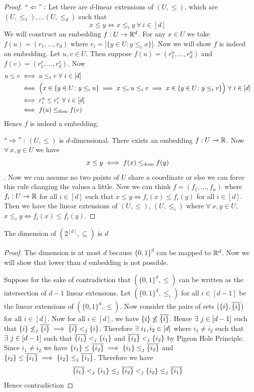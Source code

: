 \begin{proof}
	$``\Leftarrow":$ Let there are $d$-linear extensions of $(U,\leq)$, which are $(U,\leq_1),\dots(U,\leq_d)$ such that $$x\leq y\iff x\leq_i y\ \forall\ i\in[d]$$We will construct an embedding $f:U\to \mathbb{R}^d$. For any $x\in U$ we take $f(u)=(r_1,\dots, r_d)$ where $r_i=|\{y\in U\colon y\leq_i x\}|$. Now we will show $f$ is indeed an embedding. Let $u,v\in U$. Then  suppose $f(u)=(r_1^u,\dots,r_d^u)$ and $f(v)=(r_1^v,\dots, r_d^v)$. Now 
	\begin{align*}
		u\leq v&\iff u\leq_i v\ \forall \ i\in[d]\\
		 & \iff \Big(x\in\{y\in U\colon y\leq_i u\}\implies x\leq_i u\leq_i v\implies x\in   \{y\in U\colon y\leq_i v\}  \Big)\ \forall \ i\in[d]\\
		 & \iff r_i^u\leq r_i^v\ \forall \ i\in[d]\\
		 & \iff f(u)\domrel f(v)
	\end{align*}Hence $f$ is indeed a embedding. 

$``\Rightarrow":$ $(U,\leq)$ is $d$-dimensional. There exists an embedding $f:U\to\mathbb{R}$. Now $\forall\ x,y\in U$ we have $$x\leq y\iff f(x)\leq_{\text{dom}} f(y)$$. Now we can assume no two points of $U$ share a coordinate or else we can force this rule changing the values a little. Now we can think $f=(f_1,\dots, f_n)$ where $f_i:U\to \mathbb{R}$ for all $i\in[d]$ such that $x\leq y\iff f_i(x)\leq f_i(y)$ for all $i\in[d]$. Then we have the linear extensions of $(U,\leq)$, $(U,\leq_i)$ where $\forall\ x,y\in U$, $x\leq_i y\iff f_i(x)\leq f_i(y)$.  
\end{proof}
\begin{lemma}{}{}
	The dimension of $(2^{[d]},\subseteq)$ is $d$
\end{lemma}
\begin{proof}
	The dimension is at most $d$ because $\{0,1\}^d$ can be mapped to $\mathbb{R}^d$. Now we will show that  lower than $d$ embedding is not possible. 
	
	Suppose for the sake of contradiction that $(\{0,1\}^d,\leq )$ can be written as the intersection of $d-1$ linear extensions. Let $(\{0,1\}^d,\leq_i)$ for all $i\in[d-1]$ be the linear extensions of $(\{0,1\}^d,\leq)$. Now consider the pairs of sets $(\{i\},\overline{\{i\}})$ for all $i\in[d]$. Now for all $i\in[d]$, we have $\{i\}\not\leq \overline{\{i\}}$. Hence $\exists\ j\in[d-1]$ such that $\{i\}\not\leq_j\overline{\{i\}}\implies \overline{\{i\}}<_j\{i\}$. 	Therefore $\exists\ i_1,i_2\in[d]$ where $i_1\neq i_2$ such that $\exists\ j\in[d-1]$ such that $\overline{\{i_1\}}<_j\{i_1\}$ and $\overline{\{i_2\}}<_j\{i_2\}$ by Pigeon Hole Principle. Since $i_1\neq i_2$ we have $\{i_1\}\leq \overline{\{i_2\}}\implies \{i_1\}\leq_j\overline{\{i_2\}}$ and $\{i_2\}\leq \overline{\{i_1\}}\implies \{i_2\}\leq_j\overline{\{i_1\}}$. Therefore we have $$\overline{\{i_1\}}<_j\{i_1\}\leq_j \overline{\{i_2\}}<_j\{i_2\}\leq_j\overline{\{i_1\}}$$Hence contradiction \ctr
\end{proof}

